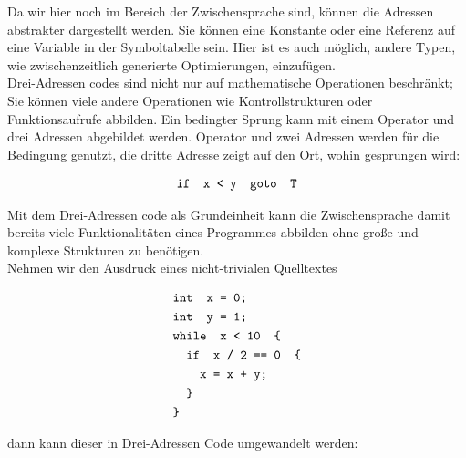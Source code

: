 Da wir hier noch im Bereich der Zwischensprache sind, können die Adressen abstrakter dargestellt werden.
Sie können eine Konstante oder eine Referenz auf eine Variable in der Symboltabelle sein.
Hier ist es auch möglich, andere Typen, wie zwischenzeitlich generierte Optimierungen, einzufügen\cite{aho:2006}.\\

Drei-Adressen codes sind nicht nur auf mathematische Operationen beschränkt;
Sie können viele andere Operationen wie Kontrollstrukturen oder Funktionsaufrufe abbilden.
Ein bedingter Sprung kann mit einem Operator und drei Adressen abgebildet werden.
Operator und zwei Adressen werden für die Bedingung genutzt, die dritte Adresse zeigt auf den Ort, wohin gesprungen wird:

\begin{figure}[H]
  \begin{align*}
    \texttt{\text{if } x < y \text{ goto } T}
  \end{align*}
\end{figure}

Mit dem Drei-Adressen code als Grundeinheit kann die Zwischensprache damit bereits viele Funktionalitäten eines Programmes abbilden ohne große und komplexe Strukturen zu benötigen.\\
Nehmen wir den Ausdruck eines nicht-trivialen Quelltextes

\begin{figure}[H]
  \begin{align*}
    &\texttt{\text{int } x = 0;}\\
    &\texttt{\text{int } y = 1;}\\
    &\texttt{\text{while } x < 10 \text{ \{}}\\
    &\texttt{\quad\text{if } x\ /\ 2\ ==\ 0 \text{ \{}}\\
    &\texttt{\quad\quad x = x + y;}\\
    &\texttt{\quad\text{\}}}\\
    &\texttt{\text{\}}}
  \end{align*}
\end{figure}

dann kann dieser in Drei-Adressen Code umgewandelt werden:



